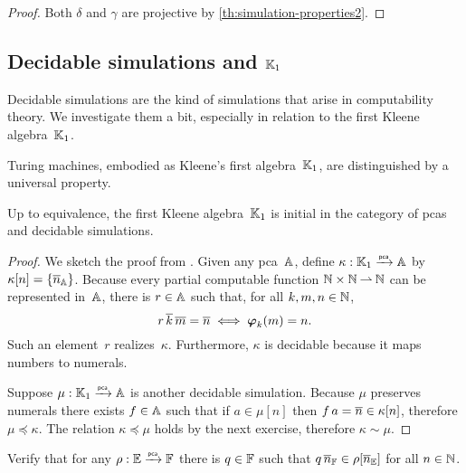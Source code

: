 \begin{proof}
  Both $\delta$ and $\gamma$ are projective by
  \cref{th:simulation-properties2}.
\end{proof}

\subsection[\texorpdfstring{Decidable simulations and $\klone$}{Decidable simulations and K1}]
{Decidable simulations and $\klone$}
\label{sec:decidable-simulations}

Decidable simulations are the kind of simulations that arise in computability theory.
We investigate them a bit, especially in relation to the first Kleene algebra~$\klone$.

Turing machines, embodied as Kleene's first algebra~$\klone$, are distinguished by a universal property.

\begin{theorem}
  Up to equivalence, the first Kleene algebra~$\klone$ is initial in the category of pcas and decidable simulations.
\end{theorem}

\begin{proof}
  We sketch the proof from \cite[Theorem 2.4.18]{Longley:94}. Given any pca~$\AA$, define $\kappa : \klone \pcato \AA$ by $\kappa[n] = \set{\numeral{n}_{\AA}}$. Because every partial computable function $\NN \times \NN \parto \NN$ can be represented in~$\AA$, there is $r \in \AA$ such that, for all $k, m, n \in \NN$,
  \begin{equation*}
    r \, \numeral{k} \, \numeral{m} = \numeral{n} \iff \pr{k}{m} = n.
  \end{equation*}
  Such an element~$r$ realizes~$\kappa$. Furthermore, $\kappa$ is decidable because it maps numbers to numerals.

  Suppose $\mu : \klone \pcato \AA$ is another decidable simulation. Because $\mu$ preserves numerals there exists $f \in \AA$ such that if $a \in \mu[n]$ then $f \, a = \numeral{n} \in \kappa[n]$, therefore $\mu \preceq \kappa$. The relation $\kappa \preceq \mu$ holds by the next exercise, therefore $\kappa \sim \mu$.
\end{proof}

\begin{exercise}
  Verify that for any $\rho : \EE \pcato \FF$ there is $q \in \FF$ such that $q \, \overline{n}_{\FF} \in \rho[\overline{n}_{\EE}]$ for all $n \in \NN$.
\end{exercise}


